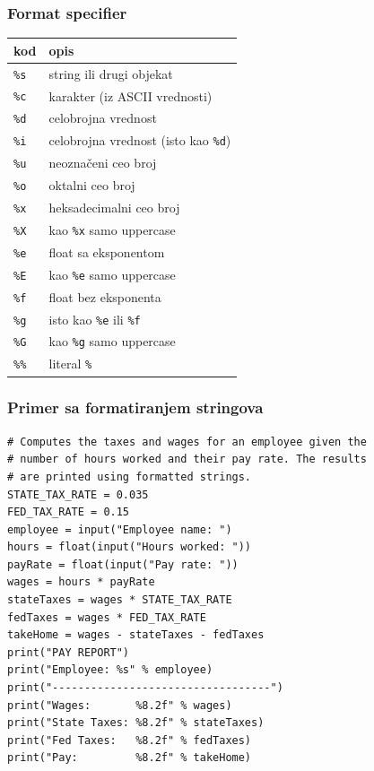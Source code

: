 \documentclass[compress]{beamer}
\begin{document}
\begin{frame}[fragile]
\frametitle{Format specifier}
\begin{tabular}{lp{7cm}}
  \textbf{kod} & \textbf{opis} \\ \hline
  \texttt{\%s} & string ili drugi objekat \\ \hline
  \texttt{\%c} & karakter (iz ASCII vrednosti) \\ \hline
  \texttt{\%d} & celobrojna vrednost \\ \hline
  \texttt{\%i} & celobrojna vrednost (isto kao \texttt{\%d}) \\ \hline
  \texttt{\%u} & neoznačeni ceo broj \\ \hline
  \texttt{\%o} & oktalni ceo broj \\ \hline
  \texttt{\%x} & heksadecimalni ceo broj \\ \hline
  \texttt{\%X} & kao \texttt{\%x} samo uppercase \\ \hline
  \texttt{\%e} & float sa eksponentom \\ \hline
  \texttt{\%E} & kao \texttt{\%e} samo uppercase \\ \hline
  \texttt{\%f} & float bez eksponenta \\ \hline
  \texttt{\%g} & isto kao \texttt{\%e} ili \texttt{\%f} \\ \hline
  \texttt{\%G} & kao \texttt{\%g} samo uppercase \\ \hline
  \texttt{\%\%} & literal \texttt{\%}
\end{tabular}
\end{frame}

\begin{frame}[fragile]
\frametitle{Primer sa formatiranjem stringova}
\begin{verbatim}
# Computes the taxes and wages for an employee given the
# number of hours worked and their pay rate. The results
# are printed using formatted strings.
STATE_TAX_RATE = 0.035
FED_TAX_RATE = 0.15
employee = input("Employee name: ")
hours = float(input("Hours worked: "))
payRate = float(input("Pay rate: "))
wages = hours * payRate
stateTaxes = wages * STATE_TAX_RATE
fedTaxes = wages * FED_TAX_RATE
takeHome = wages - stateTaxes - fedTaxes
print("PAY REPORT")
print("Employee: %s" % employee)
print("----------------------------------")
print("Wages:       %8.2f" % wages)
print("State Taxes: %8.2f" % stateTaxes)
print("Fed Taxes:   %8.2f" % fedTaxes)
print("Pay:         %8.2f" % takeHome)
\end{verbatim}
\end{frame}
\end{document}
